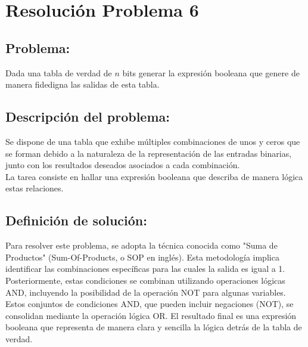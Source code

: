 \section{Resolución Problema 6}
\subsection{Problema:}
Dada una tabla de verdad de $n$ bits generar la expresión booleana que genere de manera fidedigna las salidas de esta tabla.

\subsection{\textbf{Descripción del problema:}}
Se dispone de una tabla que exhibe múltiples combinaciones de unos y ceros que se forman debido a la naturaleza de la representación de las entradas binarias, junto con los resultados deseados asociados a cada combinación. \\
La tarea consiste en hallar una expresión booleana que describa de manera lógica estas relaciones.


\subsection{\textbf{Definición de solución:}}
Para resolver este problema, se adopta la técnica conocida como "Suma de Productos" (Sum-Of-Products, o SOP en inglés). Esta metodología implica identificar las combinaciones específicas para las cuales la salida es igual a 1. Posteriormente, estas condiciones se combinan utilizando operaciones lógicas AND, incluyendo la posibilidad de la operación NOT para algunas variables. \\
Estos conjuntos de condiciones AND, que pueden incluir negaciones (NOT), se consolidan mediante la operación lógica OR. El resultado final es una expresión booleana que representa de manera clara y sencilla la lógica detrás de la tabla de verdad.\\ 


